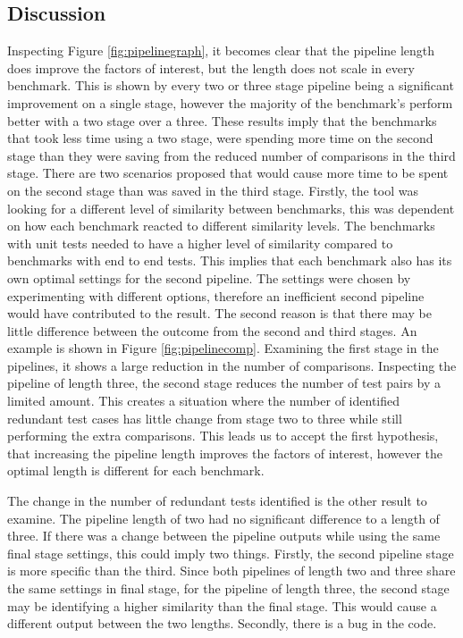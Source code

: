 \documentclass[11pt
              , a4paper
              , twoside
              , openright
              ]{report}
\begin{document}
\subsection{Discussion}

Inspecting Figure \ref{fig:pipelinegraph}, it becomes clear that the pipeline length does improve the factors of interest, but the length does not scale in every benchmark. This is shown by every two or three stage pipeline being a significant improvement on a single stage, however the majority of the benchmark's perform better with a two stage over a three. These results imply that the benchmarks that took less time using a two stage, were spending more time on the second stage than they were saving from the reduced number of comparisons in the third stage. There are two scenarios proposed that would cause more time to be spent on the second stage than was saved in the third stage. Firstly, the tool was looking for a different level of similarity between benchmarks, this was dependent on how each benchmark reacted to different similarity levels. The benchmarks with unit tests needed to have a higher level of similarity compared to benchmarks with end to end tests. This implies that each benchmark also has its own optimal settings for the second pipeline. The settings were chosen by experimenting with different options, therefore an inefficient second pipeline would have contributed to the result. The second reason is that there may be little difference between the outcome from the second and third stages. An example is shown in Figure \ref{fig:pipelinecomp}. Examining the first stage in the pipelines, it shows a large reduction in the number of comparisons. Inspecting the pipeline of length three, the second stage reduces the number of test pairs by a limited amount. This creates a situation where the number of identified redundant test cases has little change from stage two to three while still performing the extra comparisons. This leads us to accept the first hypothesis, that increasing the pipeline length improves the factors of interest, however the optimal length is different for each benchmark.

The change in the number of redundant tests identified is the other result to examine. The pipeline length of two had no significant difference to a length of three. If there was a change between the pipeline outputs while using the same final stage settings, this could imply two things. Firstly, the second pipeline stage is more specific than the third. Since both pipelines of length two and three share the same settings in final stage, for the pipeline of length three, the second stage may be identifying a higher similarity than the final stage. This would cause a different output between the two lengths. Secondly, there is a bug in the code.
\end{document}
